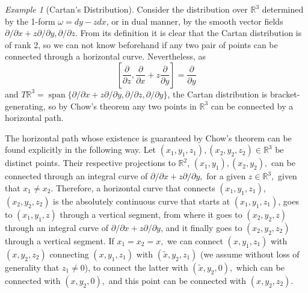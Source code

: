 \documentclass[12pt, letterpaper, reqno]{amsart}
\theoremstyle{definition}
\theoremstyle{plain}
\theoremstyle{remark}
\newtheorem{ex}{Example}
\begin{document}
\begin{ex}[Cartan's Distribution]\label{ex:cartan_distribution}
	Consider the distribution over $ \mathbb{R}^3 $ determined by the 1-form $\omega =dy- zdx $, or in dual manner, by the smooth vector fields $ \partial /\partial x + z \partial / \partial y, \partial/\partial z. $ From its definition it is clear that the Cartan distribution is of rank 2, so we can not know beforehand if any two pair of points can be connected through a horizontal curve. Nevertheless, as 
	$$ \left[ \frac{\partial}{\partial z}, \frac{\partial}{\partial x}+z \frac{\partial}{\partial y}    \right] = \frac{\partial}{\partial y}  $$ 
	and $ T \mathbb{R}^3 = \operatorname{span}\{  \partial/\partial x + z \partial / \partial y, \partial/\partial z, \partial/\partial y\} $, the Cartan distribution is bracket-generating, so by Chow's theorem any two points in $ \mathbb{R}^3 $ can be connected by a horizontal path.

	The horizontal path whose existence is guaranteed by Chow's theorem can be found explicitly in the following way. Let $ (x_1,y_1,z_1), (x_2,y_2,z_2)\in \mathbb{R}^3 $ be distinct points. Their respective projections to $ \mathbb{R}^2 $, $(x_1, y_1), (x_2,y_2),$ can be connected through an integral curve of $ \partial/\partial x+ z\partial/\partial y, $ for a given $ z\in \mathbb{R}^3, $ given that $ x_1\neq x_2. $  Therefore, a horizontal curve that connects $  (x_1,y_1,z_1)$, $(x_2,y_2,z_2)$ is the absolutely continuous curve that starts at $ (x_1,y_1,z_1) $, goes to $ (x_1,y_1,z) $ through a vertical segment, from where it goes to $(x_2,y_2,z)  $ through an integral curve of $ \partial/\partial x+ z \partial/\partial y $, and it finally goes to $ (x_2,y_2,z_2) $ through a vertical segment. If $ x_1=x_2=x, $ we can connect $ (x,y_1,z_1) $ with $ (x,y_2,z_2) $ connecting $(x, y_1,z_1)$ with $ (\tilde x, y_2, z_1) $ (we assume without loss of generality that $ z_1\neq 0 $), to connect the latter with $ (\tilde x, y_2, 0), $ which can be connected with $ (x, y_2, 0), $ and this point can be connected with $ (x, y_2,z_2). $     
\end{ex}
\end{document}
